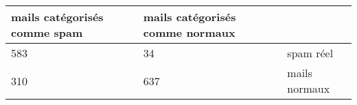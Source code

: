 \begin{tabular}{l|l|l}
mails catégorisés comme spam  & mails catégorisés comme normaux & ~ \\
\hline
 583 & 34 &   spam réel \\
\hline
  310& 637 &   mails normaux \\
\end{tabular}
